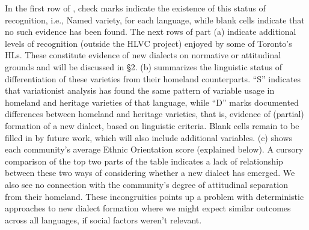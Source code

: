 \documentclass[output=paper]{LSP/langsci}
\begin{document}
In the first row of , check marks indicate the existence of this status of recognition, i.e., Named variety, for each language, while blank cells indicate that no such evidence has been found. The next rows of part (a) indicate additional levels of recognition (outside the HLVC project) enjoyed by some of Toronto’s HLs. These constitute evidence of new dialects on normative or attitudinal grounds and will be discussed in §2.  (b) summarizes the linguistic status of differentiation of these varieties from their homeland counterparts. “S” indicates that variationist analysis has found the same pattern of variable usage in homeland and heritage varieties of that language, while “D” marks documented differences between homeland and heritage varieties, that is, evidence of (partial) formation of a new dialect, based on linguistic criteria. Blank cells remain to be filled in by future work, which will also include additional variables.  (c) shows each community’s average Ethnic Orientation score (explained below). A cursory comparison of the top two parts of the table indicates a lack of relationship between these two ways of considering whether a new dialect has emerged. We also see no connection with the community’s degree of attitudinal separation from their homeland. These incongruities points up a problem with deterministic approaches to new dialect formation where we might expect similar outcomes across all languages, if social factors weren’t relevant.
\end{document}
